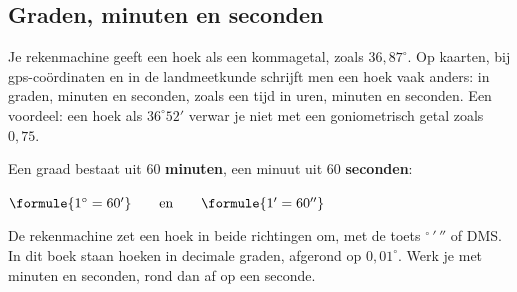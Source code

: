 \begin{oefeningen}
\end{oefeningen}

\subsection{Graden, minuten en seconden}

Je rekenmachine geeft een hoek als een kommagetal, zoals $36{,}87^\circ$. Op kaarten, bij gps-coördinaten en in de landmeetkunde schrijft men een hoek vaak anders: in graden, minuten en seconden, zoals een tijd in uren, minuten en seconden. Een voordeel: een hoek als $36^\circ 52'$ verwar je niet met een goniometrisch getal zoals $0{,}75$.

\begin{theorie}
Een graad bestaat uit 60 \textbf{\textcolor{accent}{minuten}}, een minuut uit 60 \textbf{\textcolor{accent}{seconden}}:

\vspace{1mm}
\qquad $\formule{1^\circ = 60'} \qquad \text{en} \qquad \formule{1' = 60''}$
\end{theorie}



De rekenmachine zet een hoek in beide richtingen om, met de toets $^\circ\,'\,''$ of \textsf{DMS}. In dit boek staan hoeken in decimale graden, afgerond op $0{,}01^\circ$. Werk je met minuten en seconden, rond dan af op een seconde.

